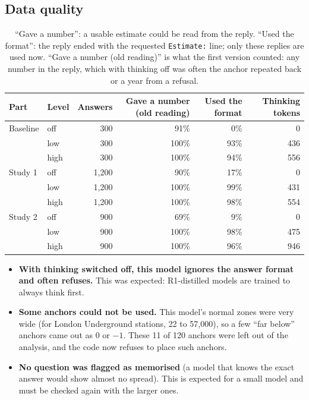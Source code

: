 \documentclass[11pt,a4paper]{article}
\begin{document}
\subsection{Data quality}

\begin{table}[ht]
\centering\small
\begin{tabular}{llrrrr}
\toprule
Part & Level & Answers & Gave a number (old reading) & Used the format & Thinking tokens \\
\midrule
Baseline & off & 300 & 91\% & 0\% & 0 \\
 & low & 300 & 100\% & 93\% & 436 \\
 & high & 300 & 100\% & 94\% & 556 \\
Study 1 & off & 1,200 & 90\% & 17\% & 0 \\
 & low & 1,200 & 100\% & 99\% & 431 \\
 & high & 1,200 & 100\% & 98\% & 554 \\
Study 2 & off & 900 & 69\% & 9\% & 0 \\
 & low & 900 & 100\% & 98\% & 475 \\
 & high & 900 & 100\% & 96\% & 946 \\
\bottomrule
\end{tabular}
\caption{\enquote{Gave a number}: a usable estimate could be read from the reply. \enquote{Used the format}: the reply ended with the requested \texttt{Estimate:} line; only these replies are used now. \enquote{Gave a number (old reading)} is what the first version counted: any number in the reply, which with thinking off was often the anchor repeated back or a year from a refusal.}
\end{table}

\begin{itemize}
  \item \textbf{With thinking switched off, this model ignores the answer format and often refuses.} This was expected: R1-distilled models are trained to always think first.
  \item \textbf{Some anchors could not be used.} This model's normal zones were very wide (for London Underground stations, 22 to 57,000), so a few \enquote{far below} anchors came out as 0 or $-1$. These 11 of 120 anchors were left out of the analysis, and the code now refuses to place such anchors.
  \item \textbf{No question was flagged as memorised} (a model that knows the exact answer would show almost no spread). This is expected for a small model and must be checked again with the larger ones.
\end{itemize}
\end{document}
